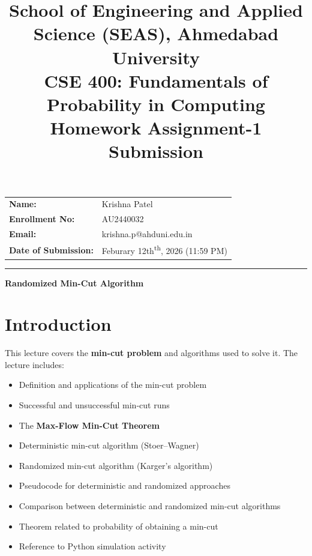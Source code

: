 \documentclass[11pt]{article}
\title{
    \normalsize School of Engineering and Applied Science (SEAS), Ahmedabad University \\
    \vspace{0.2cm}
    \textbf{CSE 400: Fundamentals of Probability in Computing}\\
    \Large Homework Assignment-1 Submission
}
\author{}
\date{}
\begin{document}
\maketitle

\vspace{-2cm}
\begin{center}
    \begin{tabular}{ll}
        \textbf{Name:} & {Krishna Patel \hspace{2.5in}} \\ [1.5ex]
        \textbf{Enrollment No:} & {AU2440032 \hspace{2.5in}} \\ [1.5ex]
        \textbf{Email:} & {krishna.p@ahduni.edu.in \hspace{2.1in}} \\ [1.5ex]
        \textbf{Date of Submission:} & {Feburary 12th\textsuperscript{th}, 2026 (11:59 PM) \hspace{1.2in}}
    \end{tabular}
\end{center}

\hrule
\vspace{0.5cm}
\begin{center}
{\LARGE\bfseries  Randomized Min-Cut Algorithm}
\end{center}

\bigskip
\section{Introduction}

This lecture covers the \textbf{min-cut problem} and algorithms used to solve it.
The lecture includes:

\begin{itemize}
    \item Definition and applications of the min-cut problem
    \item Successful and unsuccessful min-cut runs
    \item The \textbf{Max-Flow Min-Cut Theorem}
    \item Deterministic min-cut algorithm (Stoer–Wagner)
    \item Randomized min-cut algorithm (Karger’s algorithm)
    \item Pseudocode for deterministic and randomized approaches
    \item Comparison between deterministic and randomized min-cut algorithms
    \item Theorem related to probability of obtaining a min-cut
    \item Reference to Python simulation activity
\end{itemize}
\end{document}
